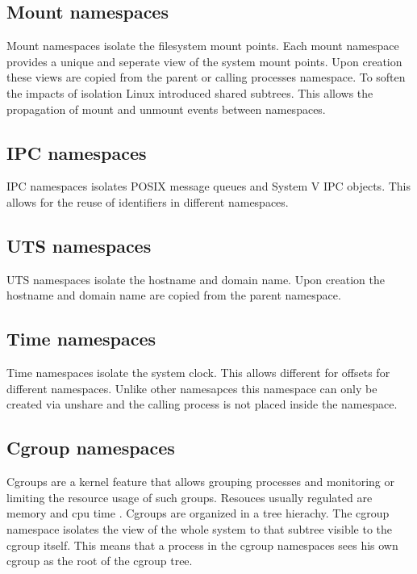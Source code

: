 \documentclass[10pt,twocolumn,a4paper]{article}
\begin{document}
\subsection{Mount namespaces}
Mount namespaces isolate the filesystem mount points. 
Each mount namespace provides a unique and seperate view of the system mount points. 
Upon creation these views are copied from the parent or calling processes namespace.
To soften the impacts of isolation Linux introduced shared subtrees. This allows the propagation of
mount and unmount events between namespaces.\cite{12}

\subsection{IPC namespaces}
IPC namespaces isolates POSIX message queues and System V IPC objects. This allows for the reuse of identifiers
in different namespaces.\cite{13}

\subsection{UTS namespaces}
UTS namespaces isolate the hostname and domain name. Upon creation the hostname and domain name are copied from the parent namespace.\cite{14}

\subsection{Time namespaces}
Time namespaces isolate the system clock. This allows different for offsets for different namespaces.
Unlike other namesapces this namespace can only be created via unshare and the calling process is
not placed inside the namespace.\cite{15}

\subsection{Cgroup namespaces}
Cgroups are a kernel feature that allows  grouping processes and monitoring or limiting the resource usage
of such groups. Resouces usually regulated are memory and cpu time \cite{16}. Cgroups are
organized in a tree hierachy. The cgroup namespace isolates the view of the whole system to
that subtree visible to the cgroup itself. This means that a process
in the cgroup namespaces sees his own cgroup as the root of the cgroup tree. \cite{17}
\end{document}
